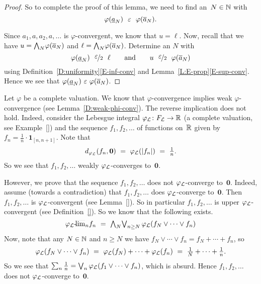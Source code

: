 \documentclass[main.tex]{subfiles}
\begin{document}
\begin{proof}
So to complete the proof of this lemma,
we need to find an~$N\in\mathbb{N}$ with
\begin{equation*}
\varphi(\ul{a}_N) \ \ \ve\ \ \varphi(\ol{a}_N).
\end{equation*}

Since $a_1,a,a_2,a,\dotsc$
is $\varphi$-convergent,
we know that $u = \ell$.
Now, recall that we have $u = \textstyle{\bigwedge}_N \varphi(\overline{a}_N)$
and $\ell = \textstyle{\bigwedge}_N \varphi(\overline{a}_N)$.
Determine
an $N$ with
\begin{equation*}
\varphi(\underline{a}_N) \ \ \smash{\nicefrac{\textstyle{\varepsilon}}{2}}\ \ \ell
\qquad\text{and}\qquad
u \ \ \smash{\nicefrac{\textstyle{\varepsilon}}{2}} \ \ \varphi(\overline{a}_N)
\end{equation*}
using Definition~\ref{D:uniformity}\ref{E-inf-conv}
and Lemma~\ref{L:E-prop}\ref{E-sup-conv}.
Hence we see that $\varphi(\underline{a}_N) \ \ve \ \varphi(\ol{a}_N)$.
\end{proof}
%
%
\begin{ex}
\label{E:weak-phi-conv}
Let $\varphi$ be a complete valuation.
We know that $\varphi$-convergence
implies weak $\varphi$-convergence (see Lemma~\ref{D:weak-phi-conv}).
The reverse implication does not hold.
Indeed,
consider the Lebesgue integral $\varphi_{\mathcal{L}}\colon F_{\mathcal{L}} \rightarrow \mathbb{R}$
(a complete valuation, see Example~\ref{})
and the sequence
$f_1,f_2, \dotsc$ of functions on~$\mathbb{R}$
given by $f_n = \frac{1}{n}\cdot\mathbf{1}_{[n,n+1]}$.
Note that 
\begin{equation*}
\textstyle{d_{\smash{\varphi_{\mathcal{L}}}}(f_n, \mathbf{0}) \ =\  \varphi_{\mathcal{L}}(|f_n|) 
\ =\ \frac{1}{n}.}
\end{equation*}
So we see that $f_1,f_2,\dotsc$ weakly $\varphi_{\mathcal{L}}$-converges to~$\mathbf{0}$.

However, we prove that the sequence $f_1,f_2,\dotsc$ 
does not $\varphi_{\mathcal{L}}$-converge to~$\mathbf{0}$.
Indeed, assume
(towards a contradiction) that
 $f_1,f_2,\dotsc$ does $\varphi_{\mathcal{L}}$-converge to~$\mathbf{0}$.
Then $f_1,f_2,\dotsc$ is $\varphi_{\mathcal{L}}$-convergent (see Lemma~\ref{}).
So in particular $f_1,f_2,\dotsc$ is upper $\varphi_{\mathcal{L}}$-convergent
(see Definition~\ref{}).
So we know that the following exists.
\begin{equation*}
{\varphi_{\mathcal{L}}}\text{-}\!\smash{\overline{\lim}_{n}} f_n 
\ = \ \textstyle{\bigwedge}_N \textstyle{\bigvee}_{n\geq N} \,\varphi_{\mathcal{L}}(f_N\vee \dotsb \vee f_n)
\end{equation*}
Now, note that any $N\in\mathbb{N}$ and $n\geq N$ we have
$f_N\vee \dotsb \vee f_n = f_N + \dotsb + f_n$,
so 
\begin{equation*}
\textstyle{\Lphi(f_N\vee \dotsb\vee f_n) 
\ =\ \Lphi(f_N) + \dotsb + \Lphi(f_n) \ = \ 
 \frac{1}{N} + \dotsb + \frac{1}{n}}.
\end{equation*}
%
%
%
So we see that  $\sum_{n} \frac{1}{n} 
= \bigvee_{n} \varphi_{\mathcal{L}}(f_1\vee\dotsb \vee f_n)$,
 which is absurd.
Hence $f_1,f_2,\dotsc$ 
does not $\varphi_{\mathcal{L}}$-converge to~$\mathbf{0}$.
\end{ex}
\end{document}
